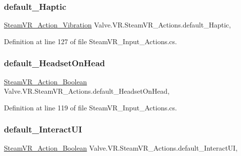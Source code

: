 \subsubsection{\texorpdfstring{default\_Haptic}{default\_Haptic}}
{\footnotesize\ttfamily \mbox{\hyperlink{class_valve_1_1_v_r_1_1_steam_v_r___action___vibration}{Steam\+V\+R\+\_\+\+Action\+\_\+\+Vibration}} Valve.\+V\+R.\+Steam\+V\+R\+\_\+\+Actions.\+default\+\_\+\+Haptic\hspace{0.3cm}{\ttfamily [static]}, {\ttfamily [get]}}



Definition at line 127 of file Steam\+V\+R\+\_\+\+Input\+\_\+\+Actions.\+cs.

\mbox{\label{class_valve_1_1_v_r_1_1_steam_v_r___actions_a747ee3d18fb046e03b34208bb6873ff1}} 
\subsubsection{\texorpdfstring{default\_HeadsetOnHead}{default\_HeadsetOnHead}}
{\footnotesize\ttfamily \mbox{\hyperlink{class_valve_1_1_v_r_1_1_steam_v_r___action___boolean}{Steam\+V\+R\+\_\+\+Action\+\_\+\+Boolean}} Valve.\+V\+R.\+Steam\+V\+R\+\_\+\+Actions.\+default\+\_\+\+Headset\+On\+Head\hspace{0.3cm}{\ttfamily [static]}, {\ttfamily [get]}}



Definition at line 119 of file Steam\+V\+R\+\_\+\+Input\+\_\+\+Actions.\+cs.

\mbox{\label{class_valve_1_1_v_r_1_1_steam_v_r___actions_ab16e31f3342f652953ef3e798efda7ac}} 
\subsubsection{\texorpdfstring{default\_InteractUI}{default\_InteractUI}}
{\footnotesize\ttfamily \mbox{\hyperlink{class_valve_1_1_v_r_1_1_steam_v_r___action___boolean}{Steam\+V\+R\+\_\+\+Action\+\_\+\+Boolean}} Valve.\+V\+R.\+Steam\+V\+R\+\_\+\+Actions.\+default\+\_\+\+Interact\+UI\hspace{0.3cm}{\ttfamily [static]}, {\ttfamily [get]}}




